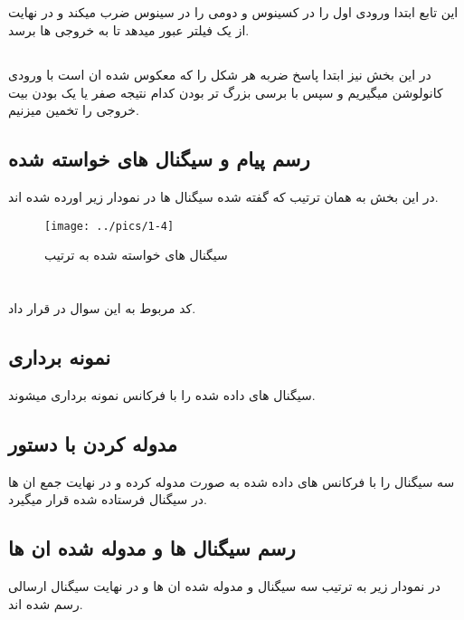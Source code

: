 \documentclass[10pt]{article}
\begin{document}
	\subsection{}
	این تابع ابتدا ورودی اول را در کسینوس و دومی را در سینوس ضرب میکند و در نهایت از یک فیلتر
	عبور میدهد تا به خروجی ها برسد.
	
	
	
	\subsection{}
	در این بخش نیز ابتدا پاسخ ضربه هر شکل را که معکوس شده ان است با ورودی کانولوشن میگیریم و سپس با برسی بزرگ تر بودن کدام نتیجه صفر یا یک بودن بیت خروجی را تخمین میزنیم. 
	
	\newpage
	\subsection{رسم پیام و سیگنال های خواسته شده}
	در این بخش به همان ترتیب که گفته شده سیگنال ها در نمودار زیر اورده شده اند.
	
	
	\begin{figure}[h]
		\centering
		\texttt{[image: ../pics/1-4]}
		\caption{سیگنال های خواسته شده به ترتیب}
		\label{fig:1-4}
	\end{figure}
	
	\newpage
	\section{}
	کد‌ مربوط به این سوال در 
	قرار داد.
	\subsection{نمونه برداری}
	سیگنال های داده شده را با فرکانس
	نمونه برداری میشوند.
	\subsection{مدوله کردن با دستور
		}
	سه سیگنال را با فرکانس های داده شده به صورت 
	مدوله کرده و در نهایت جمع ان ها در سیگنال فرستاده شده
	قرار میگیرد.
	\newpage
	\subsection{رسم سیگنال ها و مدوله شده ان ها}
	در نمودار زیر به ترتیب سه سیگنال و مدوله شده ان ها و در نهایت سیگنال ارسالی رسم شده اند.
	
\end{document}

